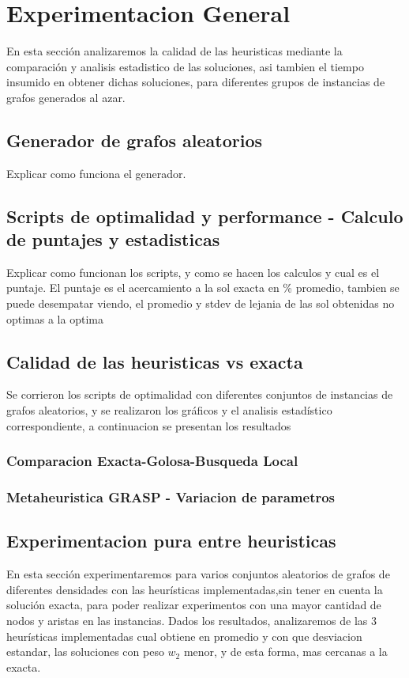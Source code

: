 \section{Experimentacion General}
En esta secci\'on analizaremos la calidad de las heuristicas mediante la comparaci\'on y analisis estadistico de las soluciones, asi tambien el tiempo insumido en obtener dichas soluciones, para diferentes grupos de instancias de grafos generados al azar.

\subsection{Generador de grafos aleatorios}
Explicar como funciona el generador.

\subsection{Scripts de optimalidad y performance - Calculo de puntajes y estadisticas}
Explicar como funcionan los scripts, y como se hacen los calculos y cual es el puntaje.
El puntaje es el acercamiento a la sol exacta en \% promedio, tambien se puede desempatar viendo, el promedio y stdev de lejania de las sol obtenidas no optimas a la optima

\subsection{Calidad de las heuristicas vs exacta}
Se corrieron los scripts de optimalidad con diferentes conjuntos de instancias de grafos aleatorios, y se realizaron los gr\'aficos y el analisis estad\'istico correspondiente, a continuacion se presentan los resultados
\subsubsection{Comparacion Exacta-Golosa-Busqueda Local}

\subsubsection{Metaheuristica GRASP - Variacion de parametros}

\subsection{Experimentacion pura entre heuristicas}
En esta secci\'on experimentaremos para varios conjuntos aleatorios de grafos de diferentes densidades con las heur\'isticas implementadas,sin tener en cuenta la soluci\'on exacta, para poder realizar experimentos con una mayor cantidad de nodos y aristas en las instancias. Dados los resultados, analizaremos de las 3 heur\'isticas implementadas cual obtiene en promedio y con que desviacion estandar, las soluciones con peso $w_2$ menor, y de esta forma, mas cercanas a la exacta.\\

